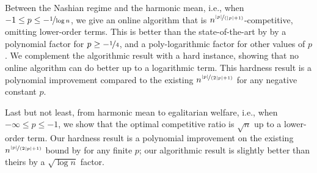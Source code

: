 \documentclass[11pt,letterpaper]{article}
\begin{document}
Between the Nashian regime and the harmonic mean, i.e., when $-1 \le p \le - \nicefrac{1}{\log n}$, we give an online algorithm that is $n^{\nicefrac{|p|}{(|p|+1)}}$-competitive, omitting lower-order terms.
This is better than the state-of-the-art by \citet{BarmanKM:AAAI:2022} by a polynomial factor for $p \ge - \nicefrac{1}{4}$, and a poly-logarithmic factor for other values of $p$.
We complement the algorithmic result with a hard instance, showing that no online algorithm can do better up to a logarithmic term.
This hardness result is a polynomial improvement compared to the existing $n^{\nicefrac{|p|}{(2|p|+1)}}$ for any negative constant $p$.

Last but not least, from harmonic mean to egalitarian welfare, i.e., when $-\infty \le p \le -1$, we show that the optimal competitive ratio is $\sqrt{n}$ up to a lower-order term.
Our hardness result is a polynomial improvement on the existing $n^{\nicefrac{|p|}{(2|p|+1)}}$ bound by \citet{BarmanKM:AAAI:2022} for any finite $p$;
our algorithmic result is slightly better than theirs by a $\sqrt{\log n}$ factor.
\end{document}
